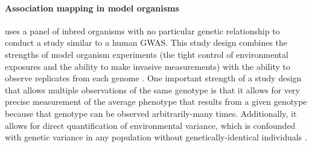 
\paragraph{Association mapping in model organisms} uses a panel of inbred organisms with no particular genetic relationship to conduct a study similar to a human GWAS.
This study design combines the strengths of model organism experiments (the tight control of environmental exposures and the ability to make invasive measurements) with the ability to observe replicates from each genome \citep{Payseur2007a,Kang2008,Kirby2010a}.
One important strength of a study design that allows multiple observations of the same genotype is that it allows for very precise measurement of the average phenotype that results from a given genotype because that genotype can be observed arbitrarily-many times.
Additionally, it allows for direct quantification of environmental variance, which is confounded with genetic variance in any population without genetically-identical individuals \citep{Falconer1965,Lynch1998}.

	


